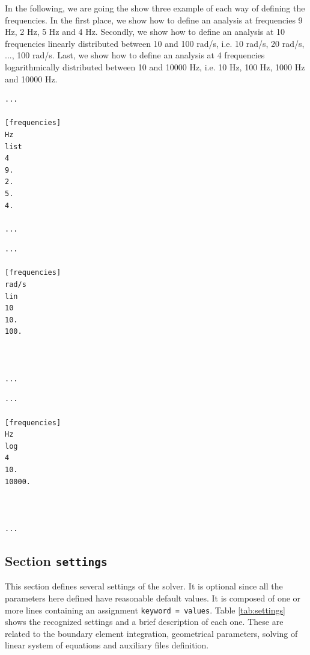 \documentclass[a4paper,fleqn]{book}
\begin{document}
In the following, we are going the show three example of each way of defining the frequencies. In the first place, we show how to define an analysis at frequencies 9 Hz, 2 Hz, 5 Hz and 4 Hz. Secondly, we show how to define an analysis at 10 frequencies linearly distributed between 10 and 100 rad/s, i.e. 10 rad/s, 20 rad/s, ..., 100 rad/s. Last, we show how to define an analysis at 4 frequencies logarithmically distributed between 10 and 10000 Hz, i.e. 10 Hz, 100 Hz, 1000 Hz and 10000 Hz.
\begin{center}
\begin{minipage}{0.32\textwidth}
\begin{Verbatim}[frame=single, fontsize=\small, label=input.dat (example of list)]
...

[frequencies]
Hz
list
4
9.
2.
5.
4.

...
\end{Verbatim}
\end{minipage}
\begin{minipage}{0.32\textwidth}
\begin{Verbatim}[frame=single, fontsize=\small, label=input.dat (example of lin)]
...

[frequencies]
rad/s
lin
10
10.
100.



...
\end{Verbatim} 
\end{minipage}
\begin{minipage}{0.32\textwidth}
\begin{Verbatim}[frame=single, fontsize=\small, label=input.dat (example of log)]
...

[frequencies]
Hz
log
4
10.
10000.



...
\end{Verbatim} 
\end{minipage}
\end{center}

\subsection{Section \texttt{settings}}
\label{sec:settings}

This section defines several settings of the solver. It is optional since all the parameters here defined have reasonable default values. It is composed of one or more lines containing an assignment \texttt{keyword = values}. Table \ref{tab:settings} shows the recognized settings and a brief description of each one. These are related to the boundary element integration, geometrical parameters, solving of linear system of equations and auxiliary files definition. 
\end{document}
